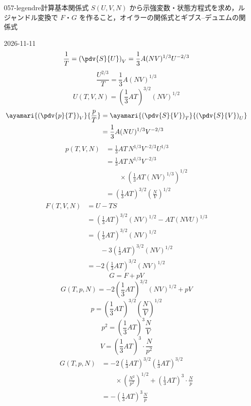 \documentclass[uplatex,dvipdfmx,a4paper,11pt]{jsarticle}
\begin{document}
\begin{mondai}{057-legendre}{計算}{基本関係式 $S(U,V,N)$ から示強変数・状態方程式を求め，ルジャンドル変換で $F$・$G$ を作ること，オイラーの関係式とギブス--デュエムの関係式}
\begin{kotaeutsushi}{2026-11-11}
\[ \frac{1}{T}=\left(\pdv{S}{U}\right)_{V}=\frac{1}{3}A(NV)^{1/3}U^{-2/3} \]
\[ \frac{U^{2/3}}{T}=\frac{1}{3}A(NV)^{1/3} \]
\[ U(T,V,N)=\left(\frac{1}{3}AT\right)^{3/2}(NV)^{1/2} \]
\begin{align*}
\ayamari{\left(\pdv{p}{T}\right)_{V}}{\frac{p}{T}}&=\ayamari{\left(\pdv{S}{V}\right)_{T}}{\left(\pdv{S}{V}\right)_{U}}\\
&=\frac{1}{3}A(NU)^{1/3}V^{-2/3}
\end{align*}
\begin{align*}
p(T,V,N)&=\frac{1}{3}AT\,N^{1/3}V^{-2/3}U^{1/3}\\
&=\frac{1}{3}AT\,N^{1/3}V^{-2/3}\\
&\qquad\times\left(\frac{1}{3}AT(NV)^{1/3}\right)^{1/2}\\
&=\left(\frac{1}{3}AT\right)^{3/2}\left(\frac{N}{V}\right)^{1/2}
\end{align*}
\begin{align*}
F(T,V,N)&=U-TS\\
&=\left(\frac{1}{3}AT\right)^{3/2}(NV)^{1/2}-AT(NVU)^{1/3}\\
&=\left(\frac{1}{3}AT\right)^{3/2}(NV)^{1/2}\\
&\qquad-3\left(\frac{1}{3}AT\right)^{3/2}(NV)^{1/2}\\
&=-2\left(\frac{1}{3}AT\right)^{3/2}(NV)^{1/2}
\end{align*}
\[ G=F+pV \]
\[ G(T,p,N)=-2\left(\frac{1}{3}AT\right)^{3/2}(NV)^{1/2}+pV \]
\[ p=\left(\frac{1}{3}AT\right)^{3/2}\left(\frac{N}{V}\right)^{1/2} \]
\[ p^{2}=\left(\frac{1}{3}AT\right)^{3}\frac{N}{V} \]
\[ V=\left(\frac{1}{3}AT\right)^{3}\cdot\frac{N}{p^{2}} \]
\begin{align*}
G(T,p,N)&=-2\left(\frac{1}{3}AT\right)^{3/2}\left(\frac{1}{3}AT\right)^{3/2}\\
&\qquad\times\left(\frac{N^{2}}{p^{2}}\right)^{1/2}+\left(\frac{1}{3}AT\right)^{3}\cdot\frac{N}{p}\\
&=-\left(\frac{1}{3}AT\right)^{3}\frac{N}{p}\\

\end{align*}
\end{kotaeutsushi}
\end{mondai}
\end{document}
